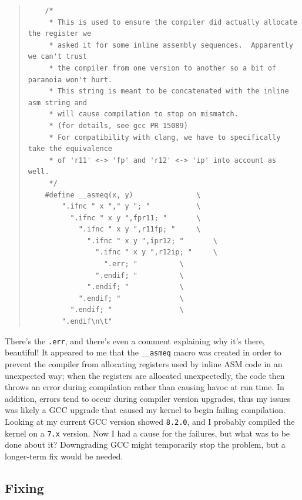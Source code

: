 \documentclass{article}
\begin{document}
\begin{quote}
\begin{verbatim}
	/*
	 * This is used to ensure the compiler did actually allocate the register we
	 * asked it for some inline assembly sequences.  Apparently we can't trust
	 * the compiler from one version to another so a bit of paranoia won't hurt.
	 * This string is meant to be concatenated with the inline asm string and
	 * will cause compilation to stop on mismatch.
	 * (for details, see gcc PR 15089)
	 * For compatibility with clang, we have to specifically take the equivalence
	 * of 'r11' <-> 'fp' and 'r12' <-> 'ip' into account as well.
	 */
	#define __asmeq(x, y)				\
		".ifnc " x "," y "; "			\
		  ".ifnc " x y ",fpr11; " 		\
		    ".ifnc " x y ",r11fp; "		\
		      ".ifnc " x y ",ipr12; " 		\
		        ".ifnc " x y ",r12ip; "		\
		          ".err; "			\
		        ".endif; "			\
		      ".endif; "			\
		    ".endif; "				\
		  ".endif; "				\
		".endif\n\t"
\end{verbatim}
\end{quote}

There's the \texttt{.err}, and there's even a comment explaining why it's there, beautiful!  It appeared to me that the \texttt{__asmeq} macro was created in order to prevent the compiler from allocating registers used by inline ASM code in an unexpected way; when the registers are allocated unexpectedly, the code then throws an error during compilation rather than causing havoc at run time.  In addition, errors tend to occur during compiler version upgrades, thus my issues was likely a GCC upgrade that caused my kernel to begin failing compilation.  Looking at my current GCC version showed \texttt{8.2.0}, and I probably compiled the kernel on a \texttt{7.x} version.  Now I had a cause for the failures, but what was to be done about it?  Downgrading GCC might temporarily stop the problem, but a longer-term fix would be needed.

\subsection{Fixing}
\end{document}
